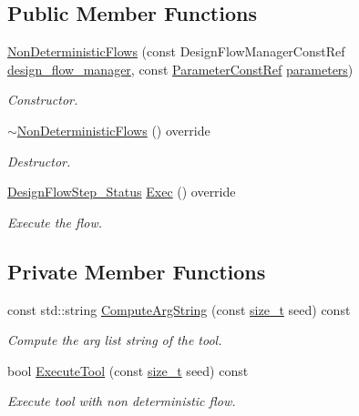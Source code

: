 \subsection*{Public Member Functions}
\begin{DoxyCompactItemize}
\item 
\hyperlink{classNonDeterministicFlows_a2c17dbfcd2cd248e3b3b4f3c6b79aeb0}{Non\+Deterministic\+Flows} (const Design\+Flow\+Manager\+Const\+Ref \hyperlink{classDesignFlowStep_ab770677ddf087613add30024e16a5554}{design\+\_\+flow\+\_\+manager}, const \hyperlink{Parameter_8hpp_a37841774a6fcb479b597fdf8955eb4ea}{Parameter\+Const\+Ref} \hyperlink{classDesignFlowStep_a802eaafe8013df706370679d1a436949}{parameters})
\begin{DoxyCompactList}\small\item\em Constructor. \end{DoxyCompactList}\item 
\hyperlink{classNonDeterministicFlows_ab5ab7e3093351601a2de3833ee1843f0}{$\sim$\+Non\+Deterministic\+Flows} () override
\begin{DoxyCompactList}\small\item\em Destructor. \end{DoxyCompactList}\item 
\hyperlink{design__flow__step_8hpp_afb1f0d73069c26076b8d31dbc8ebecdf}{Design\+Flow\+Step\+\_\+\+Status} \hyperlink{classNonDeterministicFlows_af018a9ea67d29631e1bb8eb489ac5154}{Exec} () override
\begin{DoxyCompactList}\small\item\em Execute the flow. \end{DoxyCompactList}\end{DoxyCompactItemize}
\subsection*{Private Member Functions}
\begin{DoxyCompactItemize}
\item 
const std\+::string \hyperlink{classNonDeterministicFlows_ad25c28fe042cb060d83c178de7cb533c}{Compute\+Arg\+String} (const \hyperlink{tutorial__fpt__2017_2intro_2sixth_2test_8c_a7c94ea6f8948649f8d181ae55911eeaf}{size\+\_\+t} seed) const
\begin{DoxyCompactList}\small\item\em Compute the arg list string of the tool. \end{DoxyCompactList}\item 
bool \hyperlink{classNonDeterministicFlows_a80510e30acc813ada57a66815e01202c}{Execute\+Tool} (const \hyperlink{tutorial__fpt__2017_2intro_2sixth_2test_8c_a7c94ea6f8948649f8d181ae55911eeaf}{size\+\_\+t} seed) const
\begin{DoxyCompactList}\small\item\em Execute tool with non deterministic flow. \end{DoxyCompactList}\end{DoxyCompactItemize}
